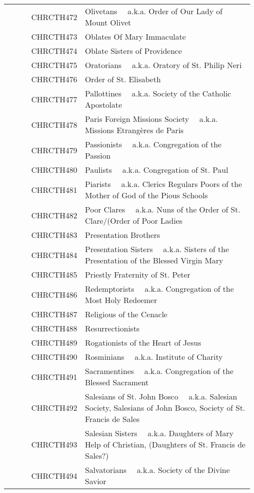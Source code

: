 \documentclass[12pt]{article}
\begin{document}
\begin{tiny}
\begin{center}
\begin{longtable}{|l|l|}
~~~~~~CHRCTH472 & Olivetans 	~~a.k.a. Order of Our Lady of Mount Olivet \\
~~~~~~CHRCTH473 & Oblates Of Mary Immaculate \\
~~~~~~CHRCTH474 & Oblate Sisters of Providence \\
~~~~~~CHRCTH475 & Oratorians 	~~a.k.a. Oratory of St. Philip Neri \\
~~~~~~CHRCTH476 & Order of St. Elisabeth \\
~~~~~~CHRCTH477 & Pallottines 	~~a.k.a. Society of the Catholic Apostolate \\
~~~~~~CHRCTH478 & Paris Foreign Missions Society 	~~a.k.a. Missions Etrangères de Paris \\
~~~~~~CHRCTH479 & Passionists	~~a.k.a. Congregation of the Passion \\
~~~~~~CHRCTH480 & Paulists 	~~a.k.a. Congregation of St. Paul \\
~~~~~~CHRCTH481 & Piarists 	~~a.k.a. Clerics Regulars Poors of the Mother of God of the Pious Schools \\
~~~~~~CHRCTH482 & Poor Clares 	~~a.k.a. Nuns of the Order of St. Clare/(Order of Poor Ladies \\
~~~~~~CHRCTH483 & Presentation Brothers \\
~~~~~~CHRCTH484 & Presentation Sisters	~~a.k.a. Sisters of the Presentation of the Blessed Virgin Mary \\
~~~~~~CHRCTH485 & Priestly Fraternity of St. Peter \\
~~~~~~CHRCTH486 & Redemptorists 	~~a.k.a. Congregation of the Most Holy Redeemer \\
~~~~~~CHRCTH487 & Religious of the Cenacle \\
~~~~~~CHRCTH488 & Resurrectionists \\
~~~~~~CHRCTH489 & Rogationists of the Heart of Jesus \\
~~~~~~CHRCTH490 & Rosminians 	~~a.k.a. Institute of Charity \\
~~~~~~CHRCTH491 & Sacramentines 	~~a.k.a. Congregation of the Blessed Sacrament \\
~~~~~~CHRCTH492 & Salesians of St. John Bosco	~~a.k.a. Salesian Society, Salesians of John Bosco, Society of St. Francis de Sales \\
~~~~~~CHRCTH493 & Salesian Sisters 	~~a.k.a. Daughters of Mary Help of Christian, (Daughters of St. Francis de Sales?) \\
~~~~~~CHRCTH494 & Salvatorians 	~~a.k.a. Society of the Divine Savior \\

\end{longtable}
\end{center}
\end{tiny}
\end{document}
